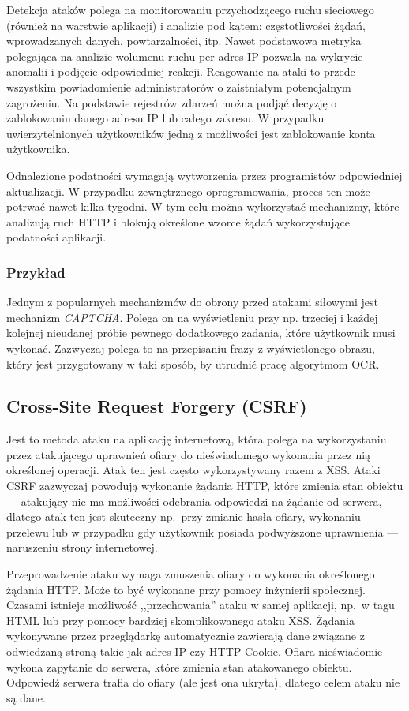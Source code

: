 \documentclass[11pt,a4paper,polish,thesis]{dcsbook}
\begin{document}
Detekcja ataków polega na monitorowaniu przychodzącego ruchu sieciowego (również na warstwie aplikacji) i analizie pod kątem: częstotliwości żądań, wprowadzanych danych, powtarzalności, itp. Nawet podstawowa metryka polegająca na analizie wolumenu ruchu per adres IP pozwala na wykrycie anomalii i podjęcie odpowiedniej reakcji. Reagowanie na ataki to przede wszystkim powiadomienie administratorów o zaistniałym potencjalnym zagrożeniu. Na podstawie rejestrów zdarzeń można podjąć decyzję o zablokowaniu danego adresu IP lub całego zakresu. W przypadku uwierzytelnionych użytkowników jedną z możliwości jest zablokowanie konta użytkownika.

Odnalezione podatności wymagają wytworzenia przez programistów odpowiedniej aktualizacji. W przypadku zewnętrznego oprogramowania, proces ten może potrwać nawet kilka tygodni. W tym celu można wykorzystać mechanizmy, które analizują ruch HTTP i blokują określone wzorce żądań wykorzystujące podatności aplikacji.

\subsubsection*{Przykład}
Jednym z popularnych mechanizmów do obrony przed atakami siłowymi jest mechanizm \textit{CAPTCHA}. Polega on na wyświetleniu przy np. trzeciej i każdej kolejnej nieudanej próbie pewnego dodatkowego zadania, które użytkownik musi wykonać. Zazwyczaj polega to na przepisaniu frazy z wyświetlonego obrazu, który jest przygotowany w taki sposób, by utrudnić pracę algorytmom OCR. 


\subsection{Cross-Site Request Forgery (CSRF)}
Jest to metoda ataku na aplikację internetową, która polega na wykorzystaniu przez atakującego uprawnień ofiary do nieświadomego wykonania przez nią określonej operacji. Atak ten jest często wykorzystywany razem z XSS.
Ataki CSRF zazwyczaj powodują wykonanie żądania HTTP, które zmienia stan obiektu --- atakujący nie ma możliwości odebrania odpowiedzi na żądanie od serwera, dlatego atak ten jest skuteczny np.~przy zmianie hasła ofiary, wykonaniu przelewu lub w przypadku gdy użytkownik posiada podwyższone uprawnienia --- naruszeniu strony internetowej.

Przeprowadzenie ataku wymaga zmuszenia ofiary do wykonania określonego żądania HTTP. Może to być wykonane przy pomocy inżynierii społecznej. Czasami istnieje możliwość ,,przechowania'' ataku w samej aplikacji, np.~w tagu HTML lub przy pomocy bardziej skomplikowanego ataku XSS. Żądania wykonywane przez przeglądarkę automatycznie zawierają dane związane z odwiedzaną stroną takie jak adres IP czy HTTP Cookie. Ofiara nieświadomie wykona zapytanie do serwera, które zmienia stan atakowanego obiektu. Odpowiedź serwera trafia do ofiary (ale jest ona ukryta), dlatego celem ataku nie są dane.
\end{document}
